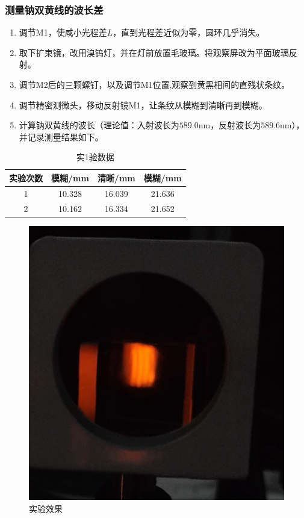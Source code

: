\documentclass[dvipsnames, svgnames,a4paper,11pt]{article}
\begin{document}
		\subsubsection{测量钠双黄线的波长差}
	\begin{enumerate}
		\item 调节M1，使咸小光程差$L$，直到光程差近似为零，圆环几乎消失。
		\item 取下扩束镜，改用溴钨灯，并在灯前放置毛玻璃。将观察屏改为平面玻璃反射。
		\item 调节M2后的三颗螺钉，以及调节M1位置,观察到黄黑相间的直残状条纹。
		\item 调节精密测微头，移动反射镜M1，让条纹从模糊到清晰再到模糊。
		\item 计算钠双黄线的波长（理论值：入射波长为$589.0$nm，反射波长为$589.6$nm），并记录测量结果如下。
	\end{enumerate}
	\begin{table}[H]
		\centering
		\begin{tabular}{|c|c|c|c|}
			\hline
			实验次数 & 模糊/mm & 清晰/mm & 模糊/mm \\ \hline
			1       & 10.328  & 16.039 & 21.636 \\ \hline
			2       & 10.162  & 16.334 & 21.652 \\ \hline
		\end{tabular}
		\caption{实1验数据}
		\label{tab:data}
	\end{table}
		\begin{figure}[H]
		\centering
		\includegraphics[width=0.4\linewidth]{images/双黄线}
		\caption{实验效果}
		\label{双黄线}
	\end{figure}
\end{document}
